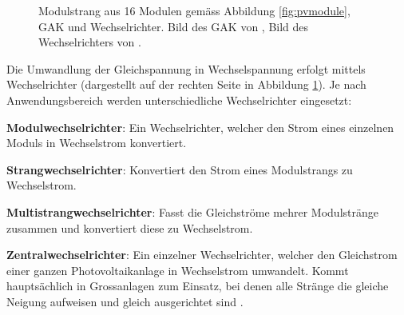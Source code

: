 \begin{figure}[h!t]
    \centering
    \caption[Modulstrang, \"Ubersichtsbild]{%
        Modulstrang aus 16 Modulen  gem\"ass Abbildung \ref{fig:pvmodule}, GAK
        und Wechselrichter. Bild des GAK  von \cite{ref:gak:gantner}, Bild des
        Wechselrichters von \cite{ref:inverter:sunnyboy}.%
    }
    \label{fig:pvarray:gak:inverter}
\end{figure}

Die    Umwandlung    der    Gleichspannung    in    Wechselspannung    erfolgt
mittels    Wechselrichter   (dargestellt    auf   der    rechten   Seite    in
Abbildung    \ref{fig:pvarray:gak:inverter}). Je     nach    Anwendungsbereich
werden  unterschiedliche  Wechselrichter  eingesetzt:

\begin{symbols}
    \firmlist
    \item[\textbf{Modulwechselrichter}:]
        Ein  Wechselrichter,  welcher  den  Strom eines  einzelnen  Moduls  in
        Wechselstrom konvertiert.
    \item[\textbf{Strangwechselrichter}:]
        Konvertiert den Strom eines Modulstrangs zu Wechselstrom.
    \item[\textbf{Multistrangwechselrichter}:]
        Fasst   die   Gleichstr\"ome   mehrer  Modulstr\"ange   zusammen   und
        konvertiert diese zu Wechselstrom.
    \item[\textbf{Zentralwechselrichter}:]
        Ein  einzelner Wechselrichter,  welcher den  Gleichstrom einer  ganzen
        Photovoltaikanlage in Wechselstrom umwandelt. Kommt haupts\"achlich in
        Grossanlagen zum Einsatz, bei denen alle Str\"ange die gleiche Neigung
        aufweisen und gleich ausgerichtet sind \cite{ref:pv:ratgeber}.
\end{symbols}

